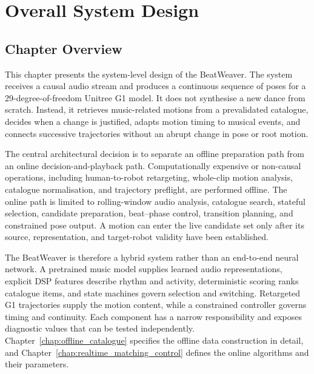 
\chapter{Overall System Design}
\label{chap:system_design}

\section{Chapter Overview}
\label{sec:design_overview}

This chapter presents the system-level design of the BeatWeaver. The
system receives a causal audio stream and produces a continuous sequence of
poses for a 29-degree-of-freedom Unitree G1 model. It does not synthesise a new
dance from scratch. Instead, it retrieves music-related motions from a
prevalidated catalogue, decides when a change is justified, adapts motion
timing to musical events, and connects successive trajectories without an
abrupt change in pose or root motion.

The central architectural decision is to separate an offline preparation path
from an online decision-and-playback path. Computationally expensive or
non-causal operations, including human-to-robot retargeting, whole-clip motion
analysis, catalogue normalisation, and trajectory preflight, are performed
offline. The online path is limited to rolling-window audio analysis,
catalogue search, stateful selection, candidate preparation, beat--phase
control, transition planning, and constrained pose output. A motion can enter
the live candidate set only after its source, representation, and target-robot
validity have been established.

The BeatWeaver is therefore a hybrid system rather than an end-to-end
neural network. A pretrained music model supplies learned audio
representations, explicit DSP features describe rhythm and activity,
deterministic scoring ranks catalogue items, and state machines govern
selection and switching. Retargeted G1 trajectories supply the motion content,
while a constrained controller governs timing and continuity. Each component
has a narrow responsibility and exposes diagnostic values that can be tested
independently. Chapter~\ref{chap:offline_catalogue} specifies the offline data
construction in detail, and Chapter~\ref{chap:realtime_matching_control}
defines the online algorithms and their parameters.




